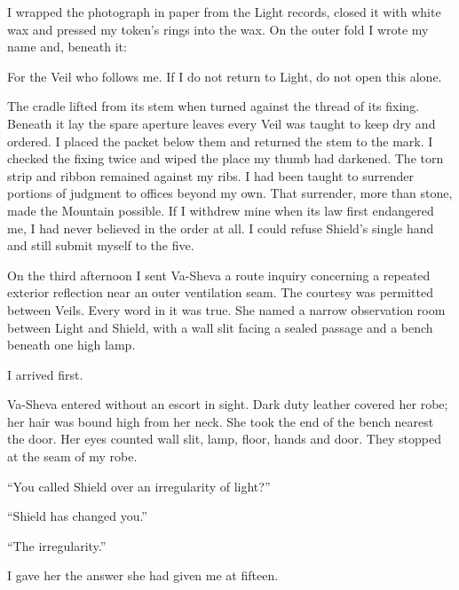 I wrapped the photograph in paper from the Light records, closed it with white wax and pressed my token's rings into the wax. On the outer fold I wrote my name and, beneath it:

\begin{scripture}
For the Veil who follows me. If I do not return to Light, do not open this alone.
\end{scripture}

The cradle lifted from its stem when turned against the thread of its fixing. Beneath it lay the spare aperture leaves every Veil was taught to keep dry and ordered. I placed the packet below them and returned the stem to the mark. I checked the fixing twice and wiped the place my thumb had darkened. The torn strip and ribbon remained against my ribs. I had been taught to surrender portions of judgment to offices beyond my own. That surrender, more than stone, made the Mountain possible. If I withdrew mine when its law first endangered me, I had never believed in the order at all. I could refuse Shield's single hand and still submit myself to the five.\par

On the third afternoon I sent Va-Sheva a route inquiry concerning a repeated exterior reflection near an outer ventilation seam. The courtesy was permitted between Veils. Every word in it was true. She named a narrow observation room between Light and Shield, with a wall slit facing a sealed passage and a bench beneath one high lamp.\par

I arrived first.\par

\ornament

Va-Sheva entered without an escort in sight. Dark duty leather covered her robe; her hair was bound high from her neck. She took the end of the bench nearest the door. Her eyes counted wall slit, lamp, floor, hands and door. They stopped at the seam of my robe.\par

``You called Shield over an irregularity of light?''\par

``Shield has changed you.''\par

``The irregularity.''\par

I gave her the answer she had given me at fifteen.\par

